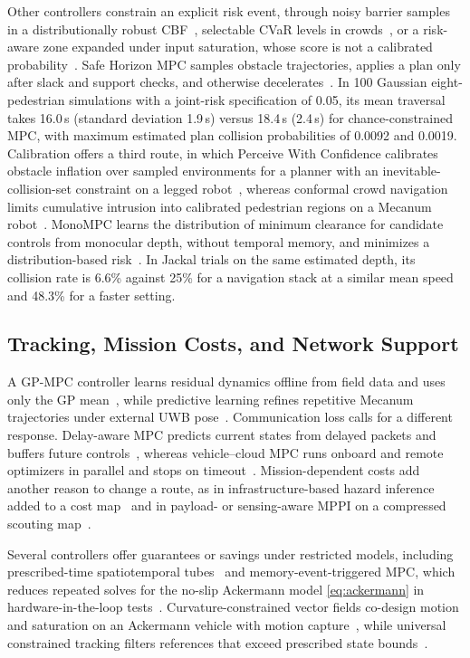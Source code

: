 Other controllers constrain an explicit risk event, through noisy barrier samples in a distributionally robust CBF~\cite{P_M03}, selectable CVaR levels in crowds~\cite{P_E27}, or a risk-aware zone expanded under input saturation, whose score is not a calibrated probability~\cite{P_S05}. Safe Horizon MPC samples obstacle trajectories, applies a plan only after slack and support checks, and otherwise decelerates~\cite{P_E25}. In 100 Gaussian eight-pedestrian simulations with a joint-risk specification of 0.05, its mean traversal takes 16.0\,s (standard deviation 1.9\,s) versus 18.4\,s (2.4\,s) for chance-constrained MPC, with maximum estimated plan collision probabilities of 0.0092 and 0.0019. Calibration offers a third route, in which Perceive With Confidence calibrates obstacle inflation over sampled environments for a planner with an inevitable-collision-set constraint on a legged robot~\cite{P_F08}, whereas conformal crowd navigation limits cumulative intrusion into calibrated pedestrian regions on a Mecanum robot~\cite{P_S48}. MonoMPC learns the distribution of minimum clearance for candidate controls from monocular depth, without temporal memory, and minimizes a distribution-based risk~\cite{P_R14}. In Jackal trials on the same estimated depth, its collision rate is 6.6\% against 25\% for a navigation stack at a similar mean speed and 48.3\% for a faster setting.

\subsection{Tracking, Mission Costs, and Network Support}

A GP-MPC controller learns residual dynamics offline from field data and uses only the GP mean~\cite{P_M33}, while predictive learning refines repetitive Mecanum trajectories under external UWB pose~\cite{P_M09}. Communication loss calls for a different response. Delay-aware MPC predicts current states from delayed packets and buffers future controls~\cite{P_M27}, whereas vehicle--cloud MPC runs onboard and remote optimizers in parallel and stops on timeout~\cite{P_E21}. Mission-dependent costs add another reason to change a route, as in infrastructure-based hazard inference added to a cost map~\cite{P_E28} and in payload- or sensing-aware MPPI on a compressed scouting map~\cite{P_X12}.

Several controllers offer guarantees or savings under restricted models, including prescribed-time spatiotemporal tubes~\cite{P_N12} and memory-event-triggered MPC, which reduces repeated solves for the no-slip Ackermann model \eqref{eq:ackermann} in hardware-in-the-loop tests~\cite{P_N14}. Curvature-constrained vector fields co-design motion and saturation on an Ackermann vehicle with motion capture~\cite{P_S07}, while universal constrained tracking filters references that exceed prescribed state bounds~\cite{P_S08}.

